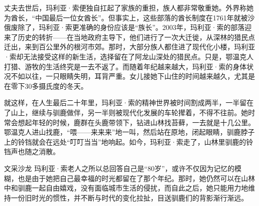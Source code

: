 丈夫去世后，玛利亚·索便独自扛起了家族的重担，族人都非常敬重她。外界称她为酋长，“中国最后一位女酋长”。但事实上，这些部落的酋长制度在1761年就被沙俄废除了，玛利亚·索更准确的身份应该是“族长”。2003年，玛利亚·索的部落迎来了历史的转折——在当地政府主导下，他们进行了一次大迁徙，从深林的猎民点迁出，来到百公里外的根河市郊。那时，大部分族人都住进了现代化小楼，玛利亚·索却无法接受这样的新生活，选择留在了阿龙山深处的猎民点。只是，鄂温克人打猎、游牧的生活终究是一去不返了。而随着年纪越来越大，玛利亚·索的身体状况不如以往，一只眼睛失明，耳背严重。女儿接她下山住的时间越来越久，尤其是在零下30多摄氏度的冬天。

就这样，在人生最后二十年里，玛利亚·索的精神世界被时间割成两半，一半留在了山上，继续与驯鹿做伴，另一半则被现代化发展的车轮撵着，不得不往前。她时常会想起年轻的时候，鹿群在头鹿带领下，钻进山林找苔藓，一去就是十几公里。鄂温克人进山找鹿，“喂——来来来”地一叫，然后站在原地，闭起眼睛，驯鹿脖子上的铃铛就会在远处“叮叮当当”地响起。如今，玛利亚·索走了，山林里驯鹿的铃铛声也随之消散。

\begin{quoteBox}{文采沙龙}
玛利亚·索老人之所以总回答自己是“80岁”，或许不仅因为记忆的模糊，也是由于她把自己最幸福的时光都留在了那个年纪。那时，她仍然可以在山林中和驯鹿一起自由嬉戏，没有面临城市生活的侵扰，而自此之后，她只能用力地维持一份旧时光的惯性，并不断与时代的变化拉扯，目送驯鹿们的背影渐行渐远。
\end{quoteBox}
